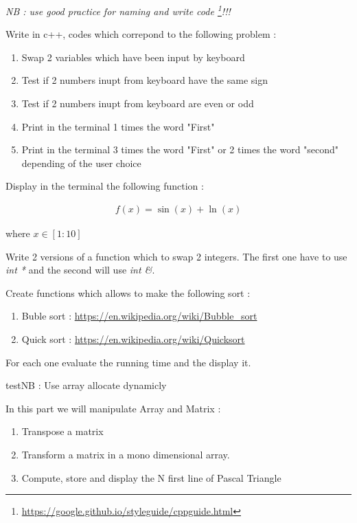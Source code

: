 \documentclass[12pt]{tdtp}
\begin{document}
\titre
\textit{NB : use good practice for naming and write code \footnote{\url{https://google.github.io/styleguide/cppguide.html}}!!!}

\Exo


Write in c++, codes which correpond to the following problem :

\begin{enumerate}
	\item Swap 2 variables which have been input by keyboard
	\item Test if 2 numbers inupt from keyboard have the same sign
	\item Test if 2 numbers inupt from keyboard are even or odd
	\item Print in the terminal 1 times the word "First"
	\item Print in the terminal 3 times the word "First" or 2 times the word "second" depending of the user choice
\end{enumerate}

\Exo


Display in the terminal the following function :

\begin{eqnarray}
	f(x) = \sin(x) + \ln(x)
\end{eqnarray}

where $x \in [1:10]$

\Exo 

Write 2 versions of a function which to swap 2 integers. The first one have to use \textit{int *} and the second will use \textit{int \&}. 
\Exo


Create functions which allows to make the following sort :

\begin{enumerate}
	\item Buble sort : \url{https://en.wikipedia.org/wiki/Bubble_sort}
	\item Quick sort : \url{https://en.wikipedia.org/wiki/Quicksort}	
\end{enumerate}

For each one evaluate the running time and the display it.


test{NB : Use array allocate dynamicly}

\Exo

In this part we will manipulate Array and Matrix :
\begin{enumerate}
	\item Transpose a matrix
	\item Transform a matrix in a mono dimensional array.
	\item Compute, store and display the N first line of Pascal Triangle	
\end{enumerate}

\end{document}

